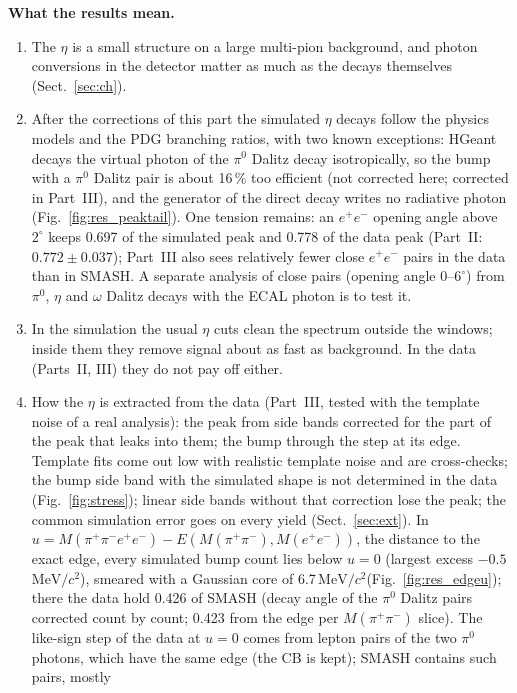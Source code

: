 \documentclass[11pt,a4paper]{article}
\newcommand{\piz}{\ensuremath{\pi^{0}}\xspace}
\newcommand{\ee}{\ensuremath{e^{+}e^{-}}\xspace}
\newcommand{\Mfour}{\ensuremath{M(\pi^{+}\pi^{-}e^{+}e^{-})}\xspace}
\newcommand{\Mee}{\ensuremath{M(e^{+}e^{-})}\xspace}
\newcommand{\Mpipi}{\ensuremath{M(\pi^{+}\pi^{-})}\xspace}
\newcommand{\MeVcc}{\ensuremath{\mathrm{MeV}/c^{2}}\xspace}
\begin{document}
\textbf{What the results mean.}
\begin{enumerate}\setlength{\itemsep}{1pt}
\item The $\eta$ is a small structure on a large multi-pion background, and photon conversions in the detector matter
      as much as the decays themselves (Sect.~\ref{sec:ch}).
\item After the corrections of this part the simulated $\eta$ decays follow the physics models and the PDG branching ratios,
      with two known exceptions: HGeant decays the virtual photon of the \piz Dalitz decay isotropically, so the bump with a
      \piz Dalitz pair is about 16\,\% too efficient (not corrected here; corrected in Part~III), and the generator of the
      direct decay writes no radiative photon (Fig.~\ref{fig:res_peaktail}). One tension remains: an \ee opening angle above
      $2^\circ$ keeps 0.697 of the simulated peak and 0.778 of the data peak (Part~II: $0.772\pm0.037$); Part~III also sees
      relatively fewer close \ee pairs in the data than in SMASH. A separate analysis of close pairs (opening angle
      0--$6^\circ$) from \piz, $\eta$ and $\omega$ Dalitz decays with the ECAL photon is to test it.
\item In the simulation the usual $\eta$ cuts clean the spectrum outside the windows; inside them they remove signal
      about as fast as background. In the data (Parts~II, III) they do not pay off either.
\item How the $\eta$ is extracted from the data (Part~III, tested with the template noise of a real analysis): the peak from
      side bands corrected for the part of the peak that leaks into them; the bump through the step at its edge. Template fits
      come out low with realistic template noise and are cross-checks; the bump side band with the simulated shape is not
      determined in the data (Fig.~\ref{fig:stress}); linear side bands without that correction lose the peak; the common
      simulation error goes on every yield (Sect.~\ref{sec:ext}). In $u=\Mfour-E(\Mpipi,\Mee)$, the distance to the exact
      edge, every simulated bump count lies below $u=0$ (largest excess $-0.5$\,\MeVcc), smeared with a Gaussian core of
      6.7\,\MeVcc (Fig.~\ref{fig:res_edgeu}); there the data hold 0.426 of SMASH (decay angle of the \piz Dalitz pairs
      corrected count by count; 0.423 from the edge per \Mpipi slice). The like-sign step of the data at $u=0$ comes from
      lepton pairs of the two \piz photons, which have the same edge (the CB is kept); SMASH contains such pairs, mostly

\end{enumerate}
\end{document}
